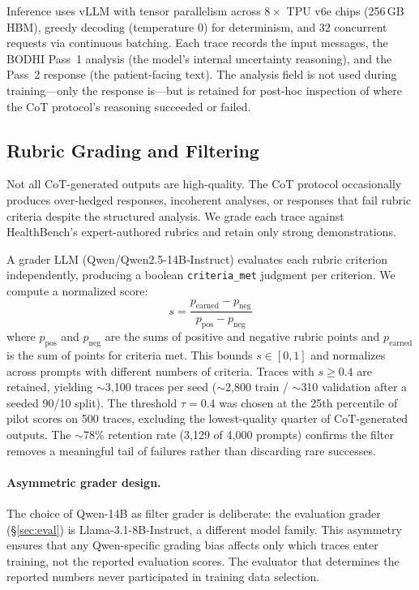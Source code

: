\documentclass{article}
\newcommand{\bodhi}{BODHI}
\begin{document}
Inference uses vLLM \citep{kwon2023efficient} with tensor parallelism across $8\times$ TPU v6e chips (256\,GB HBM), greedy decoding (temperature 0) for determinism, and 32 concurrent requests via continuous batching. Each trace records the input messages, the \bodhi{} Pass~1 analysis (the model's internal uncertainty reasoning), and the Pass~2 response (the patient-facing text). The analysis field is not used during training---only the response is---but is retained for post-hoc inspection of where the CoT protocol's reasoning succeeded or failed.

\subsection{Rubric Grading and Filtering}

Not all CoT-generated outputs are high-quality. The CoT protocol occasionally produces over-hedged responses, incoherent analyses, or responses that fail rubric criteria despite the structured analysis. We grade each trace against HealthBench's expert-authored rubrics and retain only strong demonstrations.

A grader LLM (Qwen/Qwen2.5-14B-Instruct) evaluates each rubric criterion independently, producing a boolean \texttt{criteria\_met} judgment per criterion. We compute a normalized score:
\begin{equation}
    s = \frac{p_{\text{earned}} - p_{\text{neg}}}{p_{\text{pos}} - p_{\text{neg}}}
    \label{eq:score}
\end{equation}
where $p_{\text{pos}}$ and $p_{\text{neg}}$ are the sums of positive and negative rubric points and $p_{\text{earned}}$ is the sum of points for criteria met. This bounds $s \in [0,1]$ and normalizes across prompts with different numbers of criteria. Traces with $s \geq 0.4$ are retained, yielding ${\sim}$3,100 traces per seed (${\sim}$2,800 train / ${\sim}$310 validation after a seeded 90/10 split). The threshold $\tau=0.4$ was chosen at the 25th percentile of pilot scores on 500 traces, excluding the lowest-quality quarter of CoT-generated outputs. The ${\sim}$78\% retention rate (3,129 of 4,000 prompts) confirms the filter removes a meaningful tail of failures rather than discarding rare successes.

\paragraph{Asymmetric grader design.} The choice of Qwen-14B as filter grader is deliberate: the evaluation grader (\S\ref{sec:eval}) is Llama-3.1-8B-Instruct, a different model family. This asymmetry ensures that any Qwen-specific grading bias affects only which traces enter training, not the reported evaluation scores. The evaluator that determines the reported numbers never participated in training data selection.
\end{document}
